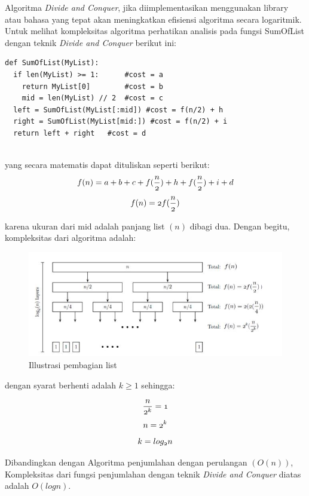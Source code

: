 Algoritma \textit{Divide and Conquer}, jika diimplementasikan menggunakan library atau bahasa yang tepat akan meningkatkan efisiensi algoritma secara logaritmik. Untuk melihat kompleksitas algoritma perhatikan analisis pada fungsi SumOfList dengan teknik \textit{Divide and Conquer} berikut ini:

\lstset{language=Python}
\label{lst:DivideAndConquerSum}
\begin{lstlisting}[frame=single]
def SumOfList(MyList):
  if len(MyList) >= 1:		#cost = a 
    return MyList[0]		#cost = b 
	mid = len(MyList) // 2	#cost = c
  left = SumOfList(MyList[:mid]) #cost = f(n/2) + h
  right = SumOfList(MyList[mid:]) #cost = f(n/2) + i
  return left + right	#cost = d
	
\end{lstlisting}

yang secara matematis dapat dituliskan seperti berikut:
$$	  \mathnormal{f(n) = a+b+c+f(\frac{n}{2})+h+f(\frac{n}{2})+i+d } $$
$$	  \mathnormal{f(n) = 2f(\frac{n}{2})} $$

karena ukuran dari mid adalah panjang list $(n)$ dibagi dua. Dengan begitu, kompleksitas dari algoritma adalah:

\begin{figure}[htbp]
\begin{center}
	\includegraphics[scale=0.8]{fig/sunario-3/fn.jpg}%
	\caption{Illustrasi pembagian list}%
	\label{fig:PembagianList}%
\end{center}
\end{figure}

dengan syarat berhenti adalah $k \geq 1$ sehingga:

$$	  \mathnormal{ \frac{n}{2^{k}}=1} $$
$$	  \mathnormal{n=2^{k}} $$
$$	  \mathnormal{k=log_{2}n} $$

Dibandingkan dengan Algoritma penjumlahan dengan perulangan $(O(n))$, Kompleksitas dari fungsi penjumlahan dengan teknik \textit{Divide and Conquer} diatas adalah $O(log n)$.

